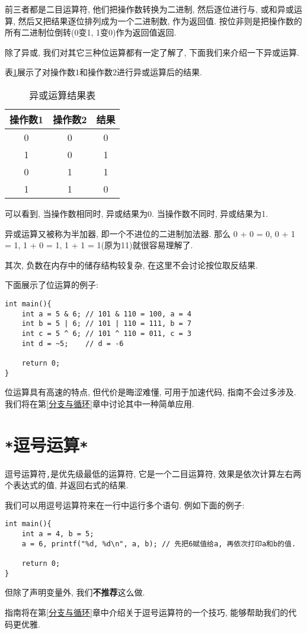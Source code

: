        前三者都是二目运算符, 他们把操作数转换为二进制, 然后逐位进行与, 或和异或运算, 然后又把结果逐位排列成为一个二进制数, 作为返回值. 按位非则是把操作数的所有二进制位倒转(0变1, 1变0)作为返回值返回.

        除了异或, 我们对其它三种位运算都有一定了解了, 下面我们来介绍一下异或运算.

        表\ref{异或运算结果表}展示了对操作数1和操作数2进行异或运算后的结果.

        \begin{table}[htbp]
            \centering
            \renewcommand\arraystretch{1.5}
            \begin{tabular}{c c|c}
                操作数1 & 操作数2 & 结果 \\
                \hline
                0       & 0      & 0    \\
                1       & 0      & 1    \\
                0       & 1      & 1    \\
                1       & 1      & 0    \\
            \end{tabular}
            \caption{异或运算结果表} \label{异或运算结果表}
        \end{table}

        可以看到, 当操作数相同时, 异或结果为0. 当操作数不同时, 异或结果为1.

        异或运算又被称为半加器, 即一个不进位的二进制加法器. 那么 0 + 0 = 0, 0 + 1 = 1, 1 + 0 = 1, 1 + 1 = 1(原为11)就很容易理解了.

        其次, 负数在内存中的储存结构较复杂, 在这里不会讨论按位取反结果.

        下面展示了位运算的例子:
\begin{lstlisting}
int main(){
    int a = 5 & 6; // 101 & 110 = 100, a = 4
    int b = 5 | 6; // 101 | 110 = 111, b = 7
    int c = 5 ^ 6; // 101 ^ 110 = 011, c = 3
    int d = ~5;    // d = -6

    return 0;
}
\end{lstlisting}

        位运算具有高速的特点, 但代价是晦涩难懂, 可用于加速代码, 指南不会过多涉及. 我们将在第\ref{分支与循环}章中讨论其中一种简单应用.

    \section{\texttt{*}逗号运算\texttt{*}} \label{逗号运算}
        逗号运算符\texttt{,}是优先级最低的运算符, 它是一个二目运算符, 效果是依次计算左右两个表达式的值, 并返回右式的结果.

        我们可以用逗号运算符来在一行中运行多个语句. 例如下面的例子:
\begin{lstlisting}
int main(){
    int a = 4, b = 5;
    a = 6, printf("%d, %d\n", a, b); // 先把6赋值给a, 再依次打印a和b的值.

    return 0;
}
\end{lstlisting}
        
        但除了声明变量外, 我们\textbf{不推荐}这么做.

        指南将在第\ref{分支与循环}章中介绍关于逗号运算符的一个技巧, 能够帮助我们的代码更优雅.